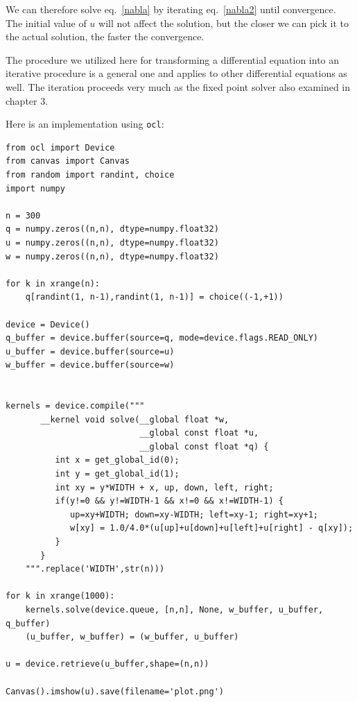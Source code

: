 \documentclass[justified,sixbynine]{tufte-book}
\def\ft{\small\tt}
\theoremstyle{plain}%
\theoremstyle{definition}
\theoremstyle{remark}
\begin{document}
\begin{fullwidth}
We can therefore solve eq.~\ref{nabla} by iterating eq.~\ref{nabla2} until convergence. The initial value of $u$ will not affect the solution, but the closer we can pick it to the actual solution, the faster the convergence.

The procedure we utilized here for transforming a differential equation into an iterative procedure is a general one and applies to other differential equations as well. The iteration proceeds very much as the fixed point solver also examined in chapter 3.

Here is an implementation using {\ft ocl}:

\begin{lstlisting}
from ocl import Device
from canvas import Canvas
from random import randint, choice
import numpy

n = 300
q = numpy.zeros((n,n), dtype=numpy.float32)
u = numpy.zeros((n,n), dtype=numpy.float32)
w = numpy.zeros((n,n), dtype=numpy.float32)

for k in xrange(n):
    q[randint(1, n-1),randint(1, n-1)] = choice((-1,+1))

device = Device()
q_buffer = device.buffer(source=q, mode=device.flags.READ_ONLY)
u_buffer = device.buffer(source=u)
w_buffer = device.buffer(source=w)


kernels = device.compile("""
       __kernel void solve(__global float *w,
                           __global const float *u,
                           __global const float *q) {
          int x = get_global_id(0);
          int y = get_global_id(1);
          int xy = y*WIDTH + x, up, down, left, right;
          if(y!=0 && y!=WIDTH-1 && x!=0 && x!=WIDTH-1) {
             up=xy+WIDTH; down=xy-WIDTH; left=xy-1; right=xy+1;
             w[xy] = 1.0/4.0*(u[up]+u[down]+u[left]+u[right] - q[xy]);
          }
       }
    """.replace('WIDTH',str(n)))

for k in xrange(1000):
    kernels.solve(device.queue, [n,n], None, w_buffer, u_buffer, q_buffer)
    (u_buffer, w_buffer) = (w_buffer, u_buffer)

u = device.retrieve(u_buffer,shape=(n,n))

Canvas().imshow(u).save(filename='plot.png')
\end{lstlisting}


\end{fullwidth}
\end{document}
